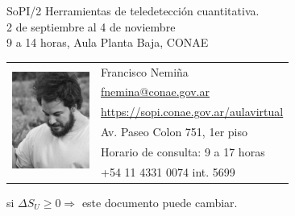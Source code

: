 \documentclass[11pt]{article}
\begin{document}
\begin{center}
    {\LARGE SoPI/2 Herramientas de teledetección cuantitativa.}\\
    {\large 2 de septiembre al 4 de noviembre}\\
    {\large 9 a 14 horas, Aula Planta Baja, CONAE}\\
\end{center}
\vspace{10mm}

\begin{center}
\begin{tabular}{ll}
  \multirow{6}{*}{\includegraphics[height=1.25in,width=1in]{pic_fran.png}} &
    \large Francisco Nemiña \\
  & \large \url{fnemina@conae.gov.ar} \\
  & \large \url{https://sopi.conae.gov.ar/aulavirtual} \\
  & \large Av. Paseo Colon 751, 1er piso\\
  & \large Horario de consulta: 9 a 17 horas\\
  & \large +54 11 4331 0074 int. 5699 \\
\end{tabular}
\end{center}
\vspace{5mm}
\begin{center} si $\Delta S_U \ge 0 \Rightarrow$ este documento puede cambiar. \\
\end{center}
\end{document}
